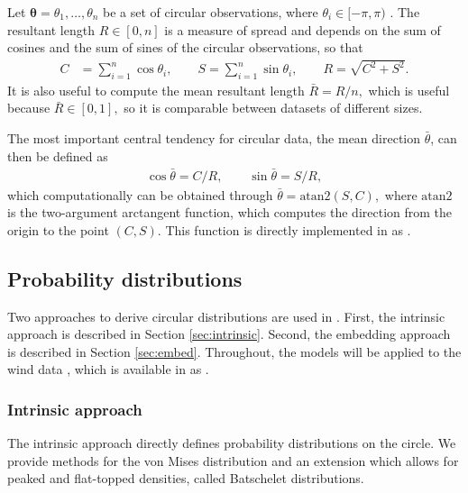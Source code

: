 Let \(\boldsymbol{\theta}= \theta_1, \dots, \theta_n\) be a set of
circular observations, where \(\theta_i \in [-\pi, \pi)\) . The
resultant length \(R\in[0, n]\) is a measure of spread and depends on
the sum of cosines and the sum of sines of the circular observations, so
that \begin{align}
C &= \sum_{i=1}^n\cos \theta_i, \qquad
S = \sum_{i=1}^n\sin \theta_i, \qquad
R = \sqrt{C^2 + S^2}.
\end{align} It is also useful to compute the mean resultant length
\(\bar{R} = R/n,\) which is useful because \(\bar{R} \in [0, 1],\) so it
is comparable between datasets of different sizes.

The most important central tendency for circular data, the mean
direction \(\bar\theta\), can then be defined as \begin{align}
\cos \bar \theta = C/R, \qquad
\sin \bar \theta = S/R,
\end{align} which computationally can be obtained through
\(\bar \theta = \text{atan2}(S, C),\) where \(\text{atan2}\) is the
two-argument arctangent function, which computes the direction from the
origin to the point \((C, S)\). This function is directly implemented in
 as .

\hypertarget{probability-distributions}{%
\subsection{Probability distributions}\label{probability-distributions}}

\label{sec:probdist} Two approaches to derive circular distributions are
used in . First, the intrinsic approach is described in
Section \ref{sec:intrinsic}. Second, the embedding approach is described
in Section \ref{sec:embed}. Throughout, the models will be applied to
the wind data \citep{agostinelli2007robust, fisher1995statistical},
which is available in  as .

\hypertarget{intrinsic-approach}{%
\subsubsection{Intrinsic approach}\label{intrinsic-approach}}

\label{sec:intrinsic}

The intrinsic approach directly defines probability distributions on the
circle. We provide methods for the von Mises distribution and an
extension which allows for peaked and flat-topped densities, called
Batschelet distributions.

